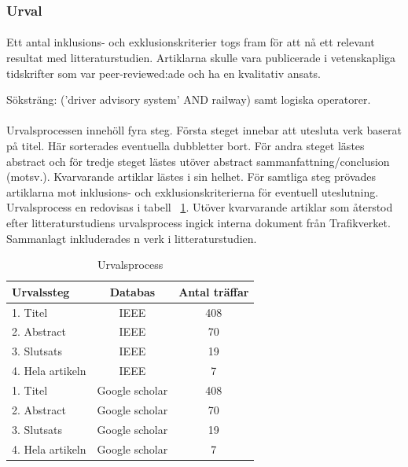 \subsubsection{Urval}
\paragraph{}
Ett antal inklusions- och exklusionskriterier togs fram för att nå ett relevant resultat med litteraturstudien.
Artiklarna skulle vara publicerade i vetenskapliga tidskrifter som var peer-reviewed:ade och ha en kvalitativ ansats.


Söksträng: ('driver advisory system' AND railway) samt logiska operatorer.

\paragraph{}
Urvalsprocessen innehöll fyra steg.
Första steget innebar att utesluta verk baserat på titel.
Här sorterades eventuella dubbletter bort.
För andra steget lästes abstract och för tredje steget lästes utöver abstract sammanfattning/conclusion (motsv.).
Kvarvarande artiklar lästes i sin helhet.
För samtliga steg prövades artiklarna mot inklusions- och exklusionskriterierna för eventuell uteslutning.
Urvalsprocess en redovisas i tabell ~\ref{tab:Urvalsprocess}.
Utöver kvarvarande artiklar som återstod efter litteraturstudiens urvalsprocess ingick interna dokument från Trafikverket.
Sammanlagt inkluderades n verk i litteraturstudien.

\begin{table}
    \centering
    \begin{tabular}{|l|c|c|}
        \hline
        Urvalssteg & Databas & Antal träffar \\
        \hline
        1. Titel & IEEE & 408 \\
        2. Abstract & IEEE & 70 \\
        3. Slutsats & IEEE & 19 \\
        4. Hela artikeln & IEEE & 7 \\
        1. Titel & Google scholar & 408 \\
        2. Abstract & Google scholar & 70 \\
        3. Slutsats & Google scholar & 19 \\
        4. Hela artikeln & Google scholar & 7 \\
        \hline
    \end{tabular}
    \caption{Urvalsprocess}
    \label{tab:Urvalsprocess}
\end{table}




